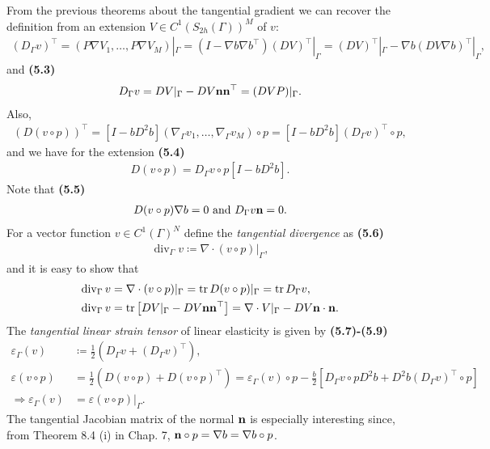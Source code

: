 \documentclass[oneside]{book}
\numberwithin{equation}{section}
\begin{document}
From the previous theorems about the tangential gradient we can recover the definition from an extension $V\in C^1(S_{2h}(\Gamma))^M$ of $v$:
\begin{align*}
    (D_\Gamma v)^\top = (P\nabla V_1,\ldots,P\nabla V_M)|_\Gamma = (I - \nabla b\nabla b^\top)(DV)^\top|_\Gamma = (DV)^\top|_\Gamma - \nabla b(DV\nabla b)^\top|_\Gamma,
\end{align*}
and \textbf{(5.3)}
\begin{align*}
    D_\Gamma v = DV|_\Gamma - DV{\bf n}{\bf n}^\top = (DVP)|_\Gamma.
\end{align*}
Also,
\begin{align*}
    (D(v\circ p))^\top = [I - bD^2b]\left(\nabla_\Gamma v_1,\ldots,\nabla_\Gamma v_M\right)\circ p = [I - bD^2b](D_\Gamma v)^\top\circ p,
\end{align*}
and we have for the extension \textbf{(5.4)}
\begin{align*}
    D(v\circ p) = D_\Gamma v\circ p[I - bD^2b].
\end{align*}
Note that \textbf{(5.5)}
\begin{align*}
    D(v\circ p)\nabla b = 0 \mbox{ and } D_\Gamma v{\bf n} = 0.
\end{align*}
For a vector function $v\in C^1(\Gamma)^N$ define the \textit{tangential divergence} as \textbf{(5.6)}
\begin{align*}
    \operatorname{div}_\Gamma v\coloneqq\nabla\cdot(v\circ p)|_\Gamma,
\end{align*}
and it is easy to show that
\begin{align*}
    \operatorname{div}_\Gamma v &= \nabla\cdot(v\circ p)|_\Gamma = \operatorname{tr}D(v\circ p)|_\Gamma = \operatorname{tr}D_\Gamma v,\\
    \operatorname{div}_\Gamma v &= \operatorname{tr}\left[DV|_\Gamma - DV{\bf n}{\bf n}^\top\right] = \nabla\cdot V|_\Gamma - DV{\bf n}\cdot{\bf n}.
\end{align*}
The \textit{tangential linear strain tensor} of linear elasticity is given by \textbf{(5.7)-(5.9)}
\begin{align*}
    \varepsilon_\Gamma(v) &\coloneqq\frac{1}{2}\left(D_\Gamma v + (D_\Gamma v)^\top\right),\\
    \varepsilon(v\circ p) &= \frac{1}{2}\left(D(v\circ p) + D(v\circ p)^\top\right) = \varepsilon_\Gamma(v)\circ p - \frac{b}{2}\left[D_\Gamma v\circ pD^2b + D^2b(D_\Gamma v)^\top\circ p\right]\\
    \Rightarrow\varepsilon_\Gamma(v) &= \varepsilon(v\circ p)|_\Gamma.
\end{align*}
The tangential Jacobian matrix of the normal ${\bf n}$ is especially interesting since, from Theorem 8.4 (i) in Chap. 7, ${\bf n}\circ p = \nabla b = \nabla b\circ p$.
\end{document}
